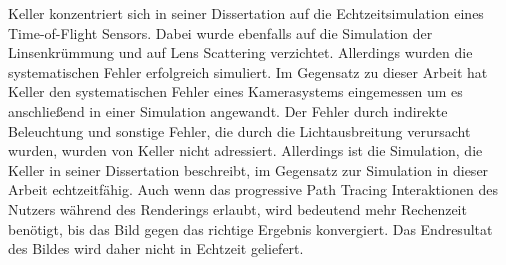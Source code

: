 \documentclass[thesis.tex]{subfiles}
\begin{document}
Keller \cite{bib:Keller2015} konzentriert sich in seiner Dissertation auf die Echtzeitsimulation eines Time-of-Flight Sensors. Dabei wurde ebenfalls auf die Simulation der Linsenkrümmung und auf Lens Scattering verzichtet. Allerdings wurden die systematischen Fehler erfolgreich simuliert. Im Gegensatz zu dieser Arbeit hat Keller den systematischen Fehler eines Kamerasystems eingemessen um es anschließend in einer Simulation angewandt. Der Fehler durch indirekte Beleuchtung und sonstige Fehler, die durch die Lichtausbreitung verursacht wurden, wurden von Keller nicht adressiert. Allerdings ist die Simulation, die Keller in seiner Dissertation beschreibt, im Gegensatz zur Simulation in dieser Arbeit echtzeitfähig. Auch wenn das progressive Path Tracing Interaktionen des Nutzers während des Renderings erlaubt, wird bedeutend mehr Rechenzeit benötigt, bis das Bild gegen das richtige Ergebnis konvergiert. Das Endresultat des Bildes wird daher nicht in Echtzeit geliefert. 

\subfilebib %
\end{document}
